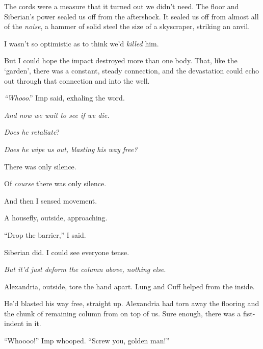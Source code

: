 The cords were a measure that it turned out we didn't need.  The floor and Siberian's power sealed us off from the aftershock.  It sealed us off from almost all of the \emph{noise}, a hammer of solid steel the size of a skyscraper, striking an anvil.



I wasn't so optimistic as to think we'd \emph{killed} him.



But I could hope the impact destroyed more than one body.  That, like the `garden', there was a constant, steady connection, and the devastation could echo out through that connection and into the well.



\emph{``Whooo}.''\emph{  }Imp said, exhaling the word.



\emph{And now we wait to see if we die.}



\emph{Does he retaliate}?



\emph{Does he wipe us out, blasting his way free?}



There was only silence.



Of \emph{course} there was only silence.



And then I sensed movement.



A housefly, outside, approaching.



``Drop the barrier,'' I said.



Siberian did.  I could see everyone tense.



\emph{But it'd just deform the column above, nothing else}.



Alexandria, outside, tore the hand apart.  Lung and Cuff helped from the inside.



He'd blasted his way free, straight up.  Alexandria had torn away the flooring and the chunk of remaining column from on top of us.  Sure enough, there was a fist-indent in it.



``Whoooo!'' Imp whooped.  ``Screw you, golden man!''



